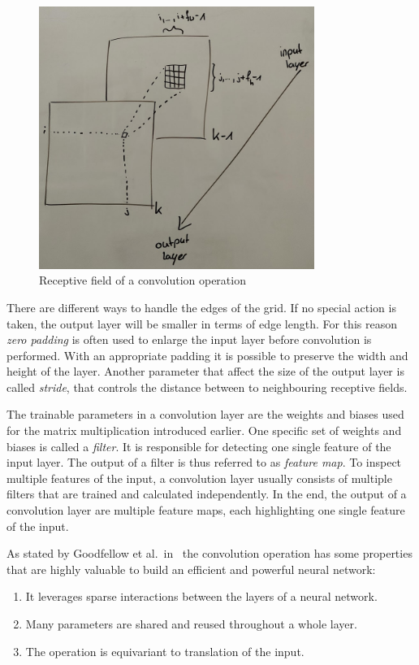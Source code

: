 \begin{figure}[h]
    \centering
    \includegraphics[width=0.8\textwidth]{images/convolution_template}
    \caption{Receptive field of a convolution operation}
    \label{fig:convolution}
\end{figure}

There are different ways to handle the edges of the grid. If no special action is taken, the output layer will be smaller in terms of edge length. For this reason \emph{zero padding} is often used to enlarge the input layer before convolution is performed. With an appropriate padding it is possible to preserve the width and height of the layer. Another parameter that affect the size of the output layer is called \emph{stride}, that controls the distance between to neighbouring receptive fields.~\cite[p.~361]{praxiseinstieg_ml17}

The trainable parameters in a convolution layer are the weights and biases used for the matrix multiplication introduced earlier. One specific set of weights and biases is called a \emph{filter}. It is responsible for detecting one single feature of the input layer. The output of a filter is thus referred to as \emph{feature map}. To inspect multiple features of the input, a convolution layer usually consists of multiple filters that are trained and calculated independently. In the end, the output of a convolution layer are multiple feature maps, each highlighting one single feature of the input.~\cite[p.~363f]{praxiseinstieg_ml17}

As stated by Goodfellow et al.\ in~\cite{DLbook16} the convolution operation has some properties that are highly valuable to build an efficient and powerful neural network:
\begin{enumerate}
    \item It leverages sparse interactions between the layers of a neural network.
    \item Many parameters are shared and reused throughout a whole layer.
    \item The operation is equivariant to translation of the input.
\end{enumerate}





